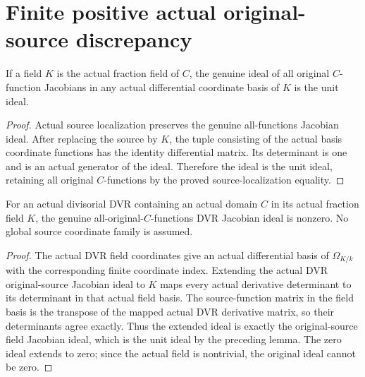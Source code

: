 \section{Finite positive actual original-source discrepancy}

\begin{lemma}\label{lem:sc0-localized-source-field-jacobian-unit}
\leanok
{}
If a field $K$ is the actual fraction field of $C$, the genuine ideal
of all original $C$-function Jacobians in any actual differential coordinate
basis of $K$ is the unit ideal.
\end{lemma}
\begin{proof}
Actual source localization preserves the genuine all-functions Jacobian
ideal. After replacing the source by $K$, the tuple consisting of the
actual basis coordinate functions has the identity differential matrix.
Its determinant is one and is an actual generator of the ideal. Therefore
the ideal is the unit ideal, retaining all original $C$-functions by the
proved source-localization equality.
\end{proof}

\begin{theorem}\label{thm:sc0-original-source-dvr-jacobian-nonzero}
\leanok
{}
For an actual divisorial DVR containing an actual domain $C$ in its actual
fraction field $K$, the genuine all-original-$C$-functions DVR Jacobian
ideal is nonzero. No global source coordinate family is assumed.
\end{theorem}
\begin{proof}
The actual DVR field coordinates give an actual differential basis of
$\Omega_{K/k}$ with the corresponding finite coordinate index. Extending
the actual DVR original-source Jacobian ideal to $K$ maps every actual
derivative determinant to its determinant in that actual field basis.
The source-function matrix in the field basis is the transpose of the
mapped actual DVR derivative matrix, so their determinants agree exactly.
Thus the extended ideal is exactly the original-source field Jacobian
ideal, which is the unit ideal by the preceding lemma. The zero ideal
extends to zero; since the actual field is nontrivial, the original ideal
cannot be zero.
\end{proof}

